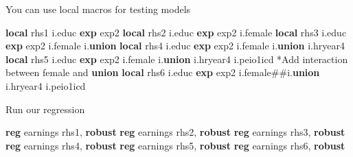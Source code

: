 \documentclass[
]{book}
\newenvironment{Shaded}{\begin{snugshade}}{\end{snugshade}}
\newcommand{\FunctionTok}[1]{\textcolor[rgb]{0.13,0.29,0.53}{\textbf{#1}}}
\newcommand{\KeywordTok}[1]{\textcolor[rgb]{0.13,0.29,0.53}{\textbf{#1}}}
\newcommand{\NormalTok}[1]{#1}
\newcommand{\OtherTok}[1]{\textcolor[rgb]{0.56,0.35,0.01}{#1}}
\begin{document}
You can use local macros for testing models

\begin{Shaded}
\begin{Highlighting}[]
\KeywordTok{local}\NormalTok{ rhs1 i.educ }\FunctionTok{exp}\NormalTok{ exp2}
\KeywordTok{local}\NormalTok{ rhs2 i.educ }\FunctionTok{exp}\NormalTok{ exp2 i.female}
\KeywordTok{local}\NormalTok{ rhs3 i.educ }\FunctionTok{exp}\NormalTok{ exp2 i.female i.}\KeywordTok{union}
\KeywordTok{local}\NormalTok{ rhs4 i.educ }\FunctionTok{exp}\NormalTok{ exp2 i.female i.}\KeywordTok{union}\NormalTok{ i.hryear4 }
\KeywordTok{local}\NormalTok{ rhs5 i.educ }\FunctionTok{exp}\NormalTok{ exp2 i.female i.}\KeywordTok{union}\NormalTok{ i.hryear4 i.peio1icd}
\NormalTok{*Add interaction between female and }\KeywordTok{union}
\KeywordTok{local}\NormalTok{ rhs6 i.educ }\FunctionTok{exp}\NormalTok{ exp2 i.female\#\#i.}\KeywordTok{union}\NormalTok{ i.hryear4 i.peio1icd}
\end{Highlighting}
\end{Shaded}

Run our regression

\begin{Shaded}
\begin{Highlighting}[]
\KeywordTok{reg}\NormalTok{ earnings }\OtherTok{\textasciigrave{}rhs1\textquotesingle{}}\NormalTok{, }\KeywordTok{robust}
\KeywordTok{reg}\NormalTok{ earnings }\OtherTok{\textasciigrave{}rhs2\textquotesingle{}}\NormalTok{, }\KeywordTok{robust}
\KeywordTok{reg}\NormalTok{ earnings }\OtherTok{\textasciigrave{}rhs3\textquotesingle{}}\NormalTok{, }\KeywordTok{robust}
\KeywordTok{reg}\NormalTok{ earnings }\OtherTok{\textasciigrave{}rhs4\textquotesingle{}}\NormalTok{, }\KeywordTok{robust}
\KeywordTok{reg}\NormalTok{ earnings }\OtherTok{\textasciigrave{}rhs5\textquotesingle{}}\NormalTok{, }\KeywordTok{robust}
\KeywordTok{reg}\NormalTok{ earnings }\OtherTok{\textasciigrave{}rhs6\textquotesingle{}}\NormalTok{, }\KeywordTok{robust}
\end{Highlighting}
\end{Shaded}
\end{document}

